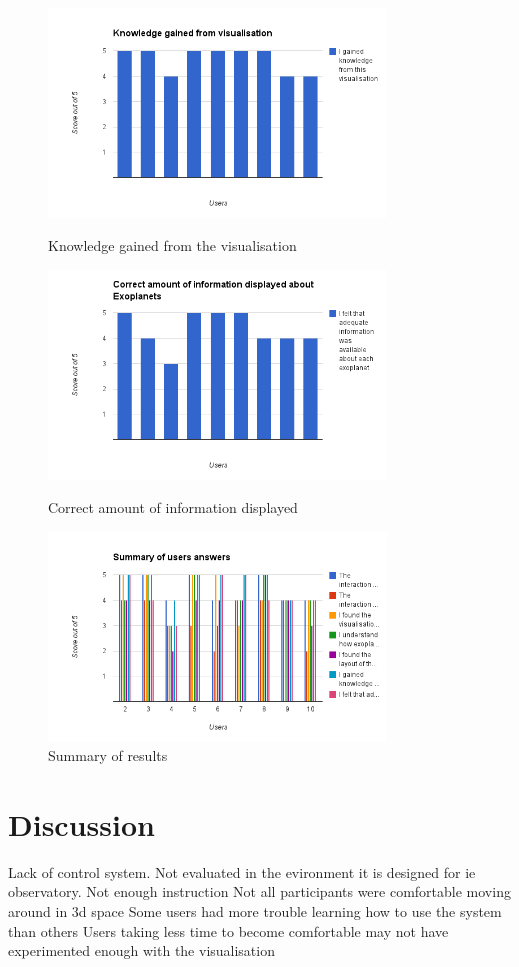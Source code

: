 \begin{figure}[H]
  \centering
      \includegraphics[width=0.8\textwidth]{images/charts/chart_7.png}
  \caption{Knowledge gained from the visualisation}  
    \label{fig:chart7}

      \includegraphics[width=0.8\textwidth]{images/charts/chart_8.png}
  \caption{Correct amount of information displayed}  
    \label{fig:chart8}
      \includegraphics[width=0.8\textwidth]{images/charts/chart_9.png}
  \caption{Summary of results}  
    \label{fig:chart9}
    
\end{figure}
\section{Discussion}
Lack of control system.
Not evaluated in the evironment it is designed for ie observatory.
Not enough instruction 
Not all participants were comfortable moving around in 3d space
Some users had more trouble learning how to use the system than others
Users taking less time to become comfortable may not have experimented enough
with the visualisation

